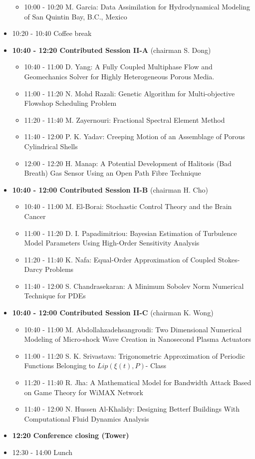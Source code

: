 \documentclass[10pt]{article}%
\begin{document}
\begin{itemize}
\begin{itemize}
    \item 10:00 - 10:20 {M. Garcia}: {Data Assimilation for Hydrodynamical Modeling of San Quintin Bay, B.C., Mexico}
  \end{itemize}
  \item 10:20 - 10:40 Coffee break
  \item {\bf 10:40 - 12:20 Contributed Session II-A} (chairman S. Dong) 
  \begin{itemize}
    \item 10:40 - 11:00 {D. Yang}: {A Fully Coupled Multiphase Flow and Geomechanics Solver for Highly Heterogeneous Porous Media.} %
    \item 11:00 - 11:20 {N. Mohd Razali}: {Genetic Algorithm for Multi-objective Flowshop Scheduling Problem} %
    \item 11:20 - 11:40 {M. Zayernouri}: {Fractional Spectral Element Method}
    \item 11:40 - 12:00 {P. K. Yadav}: {Creeping Motion of an Assemblage of Porous Cylindrical Shells}
    \item 12:00 - 12:20 {H. Manap}: {A Potential Development of Halitosis (Bad Breath) Gas Sensor Using an Open Path Fibre Technique}
  \end{itemize}
  \item {\bf 10:40 - 12:00 Contributed Session II-B} (chairman H. Cho) 
  \begin{itemize}
    \item 10:40 - 11:00 {M. El-Borai}: {Stochastic Control Theory and the Brain Cancer}   
    \item 11:00 - 11:20 {D. I. Papadimitriou}: {Bayesian Estimation of Turbulence Model Parameters Using High-Order Sensitivity Analysis}
    \item 11:20 - 11:40 {K. Nafa}: {Equal-Order Approximation of Coupled Stokes-Darcy Problems}
    \item 11:40 - 12:00 {S. Chandrasekaran}: {A Minimum Sobolev Norm Numerical Technique for PDEs} %
  \end{itemize}
  \newpage
  \item {\bf 10:40 - 12:00 Contributed Session II-C} (chairman K. Wong) 
  \begin{itemize}
    \item 10:40 - 11:00 {M. Abdollahzadehsangroudi}: {Two Dimensional Numerical Modeling of Micro-shock Wave Creation in Nanosecond Plasma Actuators}
    \item 11:00 - 11:20 {S. K. Srivastava}: {Trigonometric Approximation of Periodic Functions Belonging to $Lip(\xi(t), P)$- Class}
    \item 11:20 - 11:40 {R. Jha}: {A Mathematical Model for Bandwidth Attack Based on Game Theory for WiMAX Network}
    \item 11:40 - 12:00 {N. Hussen Al-Khalidy}: {Designing Betterf Buildings With Computational Fluid Dynamics Analysis}
  \end{itemize}
  \item {\bf 12:20 Conference closing (Tower)}
  \item 12:30 - 14:00 Lunch
\newpage
\end{itemize}
\end{document}
